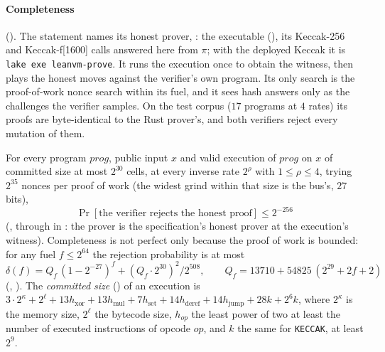 \documentclass[11pt]{article}
\begin{document}
\paragraph{Completeness} (). The statement names its honest prover,
: the executable 
(), its Keccak-256 and Keccak-f[1600] calls answered here from $\pi$; with
the deployed Keccak it is \texttt{lake exe leanvm-prove}. It runs the execution once to obtain the
witness, then plays the honest moves against the verifier's own program. Its only search is the
proof-of-work nonce search within its fuel, and it sees hash answers only as the challenges the
verifier samples. On the test corpus ($17$ programs at $4$ rates) its proofs are byte-identical to
the Rust prover's, and both verifiers reject every mutation of them.

For every program $\mathit{prog}$, public input $x$ and valid execution of $\mathit{prog}$ on $x$ of committed size at
most $2^{30}$ cells, at every inverse rate $2^\rho$ with $1 \le \rho \le 4$, trying $2^{35}$ nonces
per proof of work (the widest grind within that size is the bus's, $27$ bits),
\[
\boxed{\ \Pr[\text{the verifier rejects the honest proof}] \le 2^{-256}\ }
\]
(, through  in : the prover is the
specification's honest prover at the execution's witness). Completeness is not perfect only
because the proof of work is bounded: for any fuel $f \le 2^{64}$ the rejection probability is at
most
\[
\delta(f) = Q_f\,(1-2^{-27})^{f} + (Q_f\cdot 2^{30})^2/2^{508}, \qquad
Q_f = 13710 + 54825\,(2^{29} + 2f + 2)
\]
(, ). The \emph{committed size} () of an
execution is
$3\cdot 2^{\kappa} + 2^{\ell} + 13h_{\mathrm{xor}} + 13h_{\mathrm{mul}} + 7h_{\mathrm{set}} +
14h_{\mathrm{deref}} + 14h_{\mathrm{jump}} + 28k + 2^6 k$, where $2^\kappa$ is the memory size,
$2^\ell$ the bytecode size, $h_{op}$ the least power of two at least the number of executed
instructions of opcode $op$, and $k$ the same for \texttt{KECCAK}, at least $2^9$.
\end{document}

